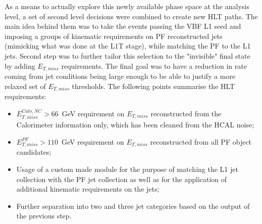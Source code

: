 \hspace{10pt} As a means to actually explore this newly available phase space at the analysis level, a set of second level decisions were combined to create new HLT paths. The main idea behind them was to take the events passing the VBF L1 seed and imposing a groups of kinematic requirements on PF reconstructed jets (mimicking what was done at the L1T stage), while matching the PF to the L1 jets. Second step was to further tailor this selection to the "invisible" final state by adding $E_{T,miss}$ requirements. The final goal was to have a reduction in rate coming from jet conditions being large enough to be able to justify a more relaxed set of $E_{T,miss}$ thresholds. The following points summarise the HLT requirements:
\begin{itemize}
    \item $E^{Calo, NC}_{T,miss}>66$~GeV requirement on $E_{T,miss}$ reconstructed from the Calorimeter information only, which has been cleaned from the HCAL noise;
    \item $E^{PF}_{T,miss}>110$~GeV requirement on $E_{T,miss}$ reconstructed from all PF object candidates;
    \item Usage of a custom made module for the purpose of matching the L1 jet collection with the PF jet collection as well as for the application of additional kinematic requirements on the jets;
    \item Further separation into two and three jet categories based on the output of the previous step.
\end{itemize}

